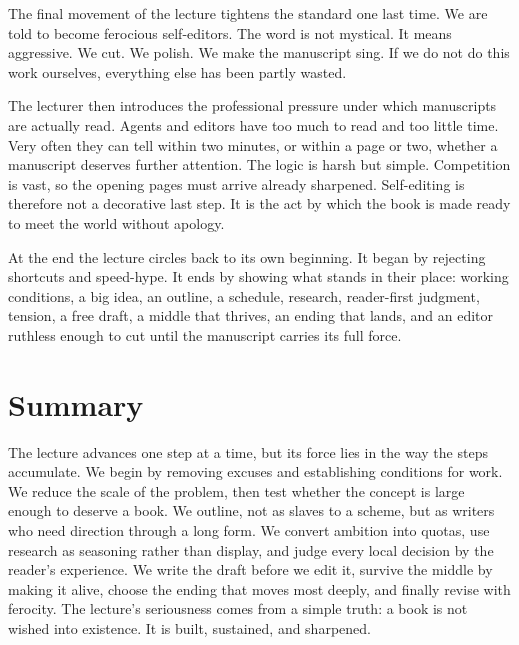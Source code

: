 The final movement of the lecture tightens the standard one last time. We are told to become ferocious self-editors. The word is not mystical. It means aggressive. We cut. We polish. We make the manuscript sing. If we do not do this work ourselves, everything else has been partly wasted.

The lecturer then introduces the professional pressure under which manuscripts are actually read. Agents and editors have too much to read and too little time. Very often they can tell within two minutes, or within a page or two, whether a manuscript deserves further attention. The logic is harsh but simple. Competition is vast, so the opening pages must arrive already sharpened. Self-editing is therefore not a decorative last step. It is the act by which the book is made ready to meet the world without apology.

At the end the lecture circles back to its own beginning. It began by rejecting shortcuts and speed-hype. It ends by showing what stands in their place: working conditions, a big idea, an outline, a schedule, research, reader-first judgment, tension, a free draft, a middle that thrives, an ending that lands, and an editor ruthless enough to cut until the manuscript carries its full force.

\section{Summary}

The lecture advances one step at a time, but its force lies in the way the steps accumulate. We begin by removing excuses and establishing conditions for work. We reduce the scale of the problem, then test whether the concept is large enough to deserve a book. We outline, not as slaves to a scheme, but as writers who need direction through a long form. We convert ambition into quotas, use research as seasoning rather than display, and judge every local decision by the reader's experience. We write the draft before we edit it, survive the middle by making it alive, choose the ending that moves most deeply, and finally revise with ferocity. The lecture's seriousness comes from a simple truth: a book is not wished into existence. It is built, sustained, and sharpened.
